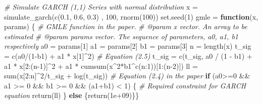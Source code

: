 \documentclass[
  11pt,
]{article}
\newenvironment{Shaded}{\begin{snugshade}}{\end{snugshade}}
\newcommand{\CommentTok}[1]{\textcolor[rgb]{0.56,0.35,0.01}{\textit{#1}}}
\newcommand{\ControlFlowTok}[1]{\textcolor[rgb]{0.13,0.29,0.53}{\textbf{#1}}}
\newcommand{\DecValTok}[1]{\textcolor[rgb]{0.00,0.00,0.81}{#1}}
\newcommand{\FloatTok}[1]{\textcolor[rgb]{0.00,0.00,0.81}{#1}}
\newcommand{\FunctionTok}[1]{\textcolor[rgb]{0.00,0.00,0.00}{#1}}
\newcommand{\NormalTok}[1]{#1}
\newcommand{\OtherTok}[1]{\textcolor[rgb]{0.56,0.35,0.01}{#1}}
\newcommand{\SpecialCharTok}[1]{\textcolor[rgb]{0.00,0.00,0.00}{#1}}
\begin{document}
\begin{Shaded}
\begin{Highlighting}[]
\CommentTok{\# Simulate GARCH (1,1) Series with normal distribution}
\NormalTok{x }\OtherTok{=} \FunctionTok{simulate\_garch}\NormalTok{(}\FunctionTok{c}\NormalTok{(}\FloatTok{0.1}\NormalTok{, }\FloatTok{0.6}\NormalTok{, }\FloatTok{0.3}\NormalTok{) , }\DecValTok{100}\NormalTok{, }\FunctionTok{rnorm}\NormalTok{(}\DecValTok{100}\NormalTok{))}
\FunctionTok{set.seed}\NormalTok{(}\DecValTok{1}\NormalTok{)}
\NormalTok{gmle }\OtherTok{=} \ControlFlowTok{function}\NormalTok{(x, params) \{}
  \CommentTok{\#\textquotesingle{} GMLE function in the paper. }
  \CommentTok{\#\textquotesingle{} @param x vector. An array to be estimated}
  \CommentTok{\#\textquotesingle{} @param params vector. The sequence of parameters, a0, a1, b1 respectively}
\NormalTok{  a0 }\OtherTok{=}\NormalTok{ params[}\DecValTok{1}\NormalTok{]}
\NormalTok{  a1 }\OtherTok{=}\NormalTok{ params[}\DecValTok{2}\NormalTok{]}
\NormalTok{  b1 }\OtherTok{=}\NormalTok{ params[}\DecValTok{3}\NormalTok{]}
\NormalTok{  n }\OtherTok{=} \FunctionTok{length}\NormalTok{(x)}
\NormalTok{  t\_sig }\OtherTok{=} \FunctionTok{c}\NormalTok{(a0}\SpecialCharTok{/}\NormalTok{(}\DecValTok{1}\SpecialCharTok{{-}}\NormalTok{b1) }\SpecialCharTok{+}\NormalTok{ a1 }\SpecialCharTok{*}\NormalTok{ x[}\DecValTok{1}\NormalTok{]}\SpecialCharTok{\^{}}\DecValTok{2}\NormalTok{) }\CommentTok{\# Equation (2.5)}
\NormalTok{  t\_sig }\OtherTok{=} \FunctionTok{c}\NormalTok{(t\_sig, a0 }\SpecialCharTok{/}\NormalTok{ (}\DecValTok{1} \SpecialCharTok{{-}}\NormalTok{ b1) }\SpecialCharTok{+}\NormalTok{ a1 }\SpecialCharTok{*}\NormalTok{ x[}\DecValTok{2}\SpecialCharTok{:}\NormalTok{(n}\DecValTok{{-}1}\NormalTok{)]}\SpecialCharTok{\^{}}\DecValTok{2} \SpecialCharTok{+}\NormalTok{ a1 }\SpecialCharTok{*} \FunctionTok{cumsum}\NormalTok{(x}\SpecialCharTok{\^{}}\DecValTok{2}\SpecialCharTok{*}\NormalTok{b1}\SpecialCharTok{\^{}}\FunctionTok{c}\NormalTok{(n}\SpecialCharTok{:}\DecValTok{1}\NormalTok{))[}\DecValTok{1}\SpecialCharTok{:}\NormalTok{(n}\DecValTok{{-}2}\NormalTok{)])}
\NormalTok{  ll }\OtherTok{=} \FunctionTok{sum}\NormalTok{(x[}\DecValTok{2}\SpecialCharTok{:}\NormalTok{n]}\SpecialCharTok{\^{}}\DecValTok{2}\SpecialCharTok{/}\NormalTok{t\_sig }\SpecialCharTok{+} \FunctionTok{log}\NormalTok{(t\_sig)) }\CommentTok{\# Equation (2.4) in the paper}
  \ControlFlowTok{if}\NormalTok{ (a0}\SpecialCharTok{\textgreater{}=}\DecValTok{0} \SpecialCharTok{\&\&}\NormalTok{ a1 }\SpecialCharTok{\textgreater{}=} \DecValTok{0} \SpecialCharTok{\&\&}\NormalTok{ b1 }\SpecialCharTok{\textgreater{}=} \DecValTok{0} \SpecialCharTok{\&\&}\NormalTok{ (a1}\SpecialCharTok{+}\NormalTok{b1) }\SpecialCharTok{\textless{}} \DecValTok{1}\NormalTok{) \{ }\CommentTok{\# Required constraint for GARCH equation}
    \FunctionTok{return}\NormalTok{(ll)}
\NormalTok{  \} }\ControlFlowTok{else}\NormalTok{ \{}\FunctionTok{return}\NormalTok{(}\FloatTok{1e+09}\NormalTok{)\}\}}


\end{Highlighting}
\end{Shaded}
\end{document}
